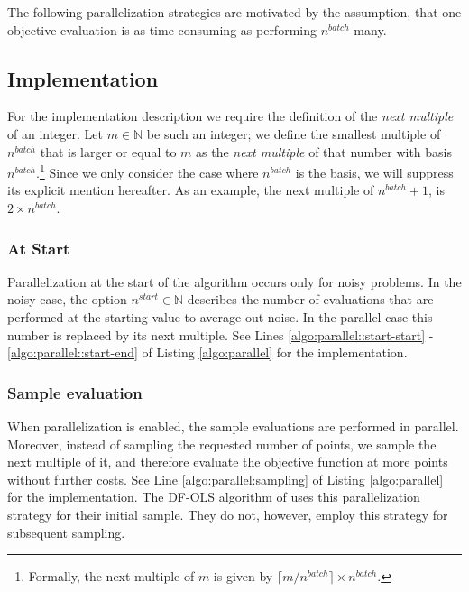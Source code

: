 The following parallelization strategies are motivated by the assumption, that one
objective evaluation is as time-consuming as performing $n^{batch}$ many.

\subsection{Implementation}\label{subsec:parallelization::implementation}

For the implementation description we require the definition of the \emph{next multiple} of an
integer. Let $m \in \mathbb{N}$ be such an integer; we define the smallest multiple of $n^{batch}$
that is larger or equal to $m$ as the \emph{next multiple} of that number with basis
$n^{batch}$.\footnote{Formally, the next multiple of $m$ is given by $\lceil m / n^{batch}\rceil
\times n^{batch}$.} Since we only consider the case where $n^{batch}$ is the basis, we will suppress
its explicit mention hereafter. As an example, the next multiple of $n^{batch} + 1$, is $2 \times
n^{batch}$.

\subsubsection{At Start}

Parallelization at the start of the algorithm occurs only for noisy problems. In the noisy case, the
option $n^{start} \in \mathbb{N}$ describes the number of evaluations that are performed at the
starting value to average out noise. In the parallel case this number is replaced by its next
multiple. See Lines \ref{algo:parallel::start-start} - \ref{algo:parallel::start-end} of Listing
\ref{algo:parallel} for the implementation.

\subsubsection{Sample evaluation}

When parallelization is enabled, the sample evaluations are performed in parallel. Moreover, instead
of sampling the requested number of points, we sample the next multiple of it, and therefore
evaluate the objective function at more points without further costs. See Line
\ref{algo:parallel:sampling} of Listing \ref{algo:parallel} for the implementation. The DF-OLS
algorithm of \cite{dfols2019} uses this parallelization strategy for their initial sample. They do
not, however, employ this strategy for subsequent sampling.

